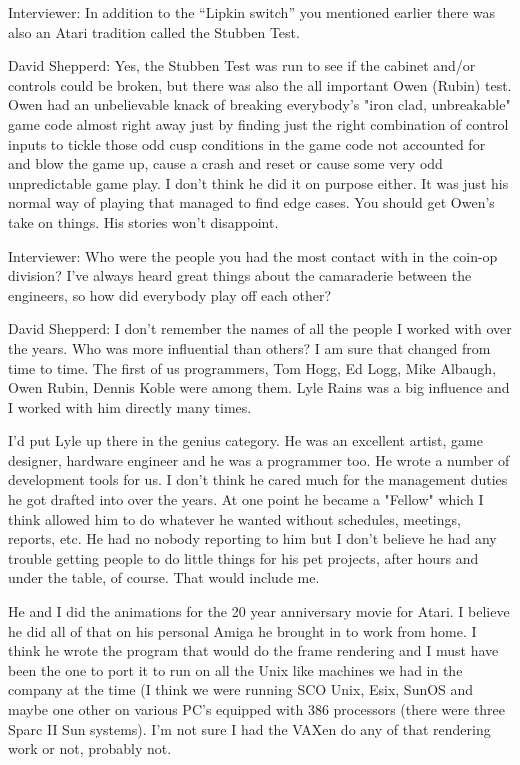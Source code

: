 \textcolor{interviewer}{Interviewer:} In addition to the “Lipkin switch” you mentioned earlier there was also an Atari tradition called the Stubben Test.

\textcolor{interviewee}{\textcolor{interviewee}{David Shepperd:}} Yes, the Stubben Test was run to see if the cabinet and/or controls could be broken, but there was also the all important Owen (Rubin) test. Owen had an unbelievable knack of breaking everybody's "iron clad, unbreakable" game code almost right away just by finding just the right combination of control inputs to tickle those odd cusp conditions in the game code not accounted for and blow the game up, cause a crash and reset or cause some very odd unpredictable game play. I don't think he did it on purpose either. It was just his normal way of playing that managed to find edge cases. You should get Owen's take on things. His stories won't disappoint. 

\textcolor{interviewer}{Interviewer:} Who were the people you had the most contact with in the coin-op division? I've always heard great things about the camaraderie between the engineers, so how did everybody play off each other? 

\textcolor{interviewee}{David Shepperd:} I don't remember the names of all the people I worked with over the years. Who was more influential than others? I am sure that changed from time to time. The first of us programmers, Tom Hogg, Ed Logg, Mike Albaugh, Owen Rubin, Dennis Koble were among them. Lyle Rains was a big influence and I worked with him directly many times. 

I'd put Lyle up there in the genius category. He was an excellent artist, game designer, hardware engineer and he was a programmer too. He wrote a number of development tools for us. I don't think he cared much for the management duties he got drafted into over the years. At one point he became a "Fellow" which I think allowed him to do whatever he wanted without schedules, meetings, reports, etc. He had no nobody reporting to him but I don't believe he had any trouble getting people to do little things for his pet projects, after hours and under the table, of course. That would include me.

He and I did the animations for the 20 year anniversary movie for Atari. I believe he did all of that on his personal Amiga he brought in to work from home. I think he wrote the program that would do the frame rendering and I must have been the one to port it to run on all the Unix like machines we had in the company at the time (I think we were running SCO Unix, Esix, SunOS and maybe one other on various PC's equipped with 386 processors (there were three Sparc II Sun systems). I'm not sure I had the VAXen do any of that rendering work or not, probably not. 

